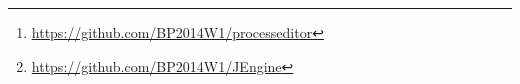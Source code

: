 \begin{abstract}
The \href{https://github.com/BP2014W1/processeditor}{Processeditor}\footnote{\url{https://github.com/BP2014W1/processeditor}} gives the opportunity to create different diagrams.
Those diagrams can be a graphical representation of process models.
They may be used to be executed inside a Process Engine.
In the following we will describe how you can model and configure Production Case Management models, which can be used for the execution inside the \href{https://github.com/BP2014W1/JEngine}{JEngine}\footnote{\url{https://github.com/BP2014W1/JEngine}}.
Before we will introduce you to the basic deployment and usage of the Processeditor.
\end{abstract}